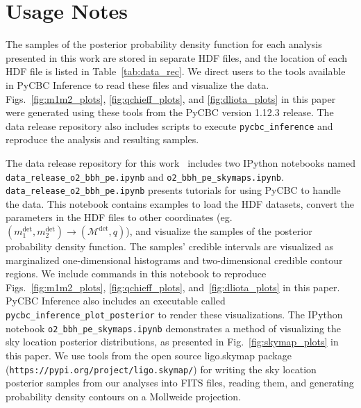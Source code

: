 \section{Usage Notes}\label{sec:con}
The samples of the posterior probability density function for each analysis presented in this work are stored in separate HDF files, and the location of each HDF file is listed in Table~\ref{tab:data_rec}. We direct users to the tools available in PyCBC Inference to read these files and visualize the data. Figs.~\ref{fig:m1m2_plots}, \ref{fig:qchieff_plots}, and \ref{fig:dliota_plots} in this paper were generated using these tools from the PyCBC version 1.12.3 release. The data release repository also includes scripts to execute \texttt{pycbc\_inference} and reproduce the analysis and resulting samples.

The data release repository for this work~\cite{data_release} includes two IPython notebooks named \verb"data_release_o2_bbh_pe.ipynb" and \verb"o2_bbh_pe_skymaps.ipynb". \newline
\verb"data_release_o2_bbh_pe.ipynb" presents tutorials for using PyCBC to handle the data. This notebook contains examples to load the HDF datasets, convert the parameters in the HDF files to other coordinates (eg. $(m_1^{\mathrm{det}}, m_2^{\mathrm{det}}) \rightarrow (\mathcal{M}^{\mathrm{det}}, q)$), and visualize the samples of the posterior probability density function. The samples' credible intervals are visualized as marginalized one-dimensional histograms and two-dimensional credible contour regions. We include commands in this notebook to reproduce Figs.~\ref{fig:m1m2_plots}, \ref{fig:qchieff_plots}, and~\ref{fig:dliota_plots} in this paper.
PyCBC Inference also includes an executable called \texttt{pycbc\_inference\_plot\_posterior} to render these visualizations. 
The IPython notebook \verb"o2_bbh_pe_skymaps.ipynb" demonstrates a method of visualizing the sky location posterior distributions, as presented in Fig.~\ref{fig:skymap_plots} in this paper. We use tools from the open source ligo.skymap package (\verb"https://pypi.org/project/ligo.skymap/") for writing the sky location posterior samples from our analyses into FITS files, reading them, and generating probability density contours on a Mollweide projection.